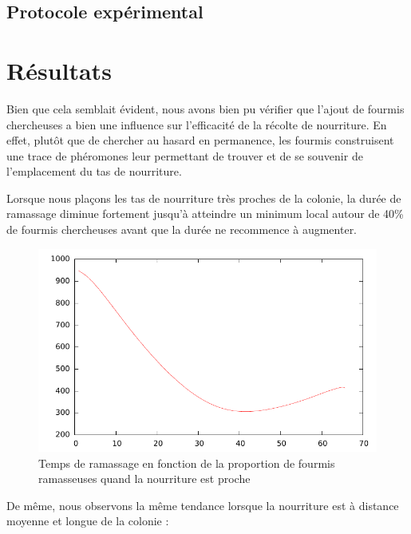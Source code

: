 \documentclass{article}
\begin{document}
\label{pourcentage}

\subsection{Protocole expérimental}
\section{Résultats}
Bien que cela semblait évident, nous avons bien pu vérifier que l'ajout de fourmis chercheuses a bien une influence sur l'efficacité de la récolte de nourriture. En effet, plutôt que de chercher au hasard en permanence, les fourmis construisent une trace de phéromones leur permettant de trouver et de se souvenir de l'emplacement du tas de nourriture.

Lorsque nous plaçons les tas de nourriture très proches de la colonie, la durée de ramassage diminue fortement jusqu'à atteindre un minimum local autour de 40\% de fourmis chercheuses avant que la durée ne recommence à augmenter.

\begin{figure}[H]
\centering
\includegraphics[scale=0.6]{near.pdf}
\caption{Temps de ramassage en fonction de la proportion de fourmis ramasseuses quand la nourriture est proche}
\label{fig:proche}
\end{figure}

De même, nous observons la même tendance lorsque la nourriture est à distance moyenne et longue de la colonie :
\end{document}
